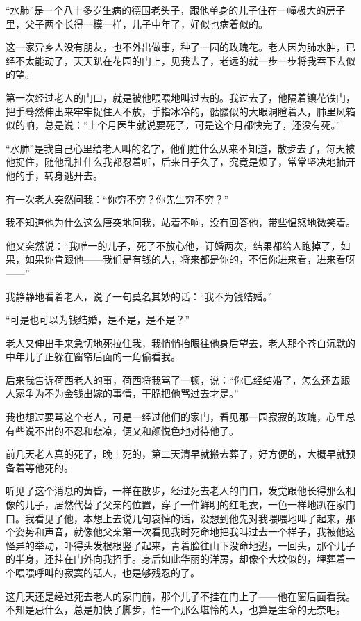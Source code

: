 \par “水肺”是一个八十多岁生病的德国老头子，跟他单身的儿子住在一幢极大的房子里，父子两个长得一模一样，儿子中年了，好似也病着似的。
\par 这一家异乡人没有朋友，也不外出做事，种了一园的玫瑰花。老人因为肺水肿，已经不太能动了，天天趴在花园的门上，见我去了，老远的就一步一步将我吞下去似的望。
\par 第一次经过老人的门口，就是被他喂喂地叫过去的。我过去了，他隔着镶花铁门，把手蓦然伸出来牢牢捉住人不放，手指冰冷的，骷髅似的大眼洞瞪着人，肺里风箱似的响，总是说：“上个月医生就说要死了，可是这个月都快完了，还没有死。”
\par “水肺”是我自己心里给老人叫的名字，他们姓什么从来不知道，散步去了，每天被他捉住，随他乱扯什么我都忍着听，后来日子久了，究竟是烦了，常常坚决地抽开他的手，转身逃开去。
\par 有一次老人突然问我：“你穷不穷？你先生穷不穷？”
\par 我不知道他为什么这么唐突地问我，站着不响，没有回答他，带些愠怒地微笑着。
\par 他又突然说：“我唯一的儿子，死了不放心他，订婚两次，结果都给人跑掉了，如果，如果你肯跟他——我们是有钱的人，将来都是你的，不信你进来看，进来看呀——”
\par 我静静地看着老人，说了一句莫名其妙的话：“我不为钱结婚。”
\par “可是也可以为钱结婚，是不是，是不是？”
\par 老人又伸出手来急切地死拉住我，我悄悄抬眼往他身后望去，老人那个苍白沉默的中年儿子正躲在窗帘后面的一角偷看我。
\par 后来我告诉荷西老人的事，荷西将我骂了一顿，说：“你已经结婚了，怎么还去跟人家争为不为金钱出嫁的事情，干脆把他骂过去才是。”
\par 我也想过要骂这个老人，可是一经过他们的家门，看见那一园寂寂的玫瑰，心里总有些说不出的不忍和悲凉，便又和颜悦色地对待他了。
\par 前几天老人真的死了，晚上死的，第二天清早就搬去葬了，好方便的，大概早就预备着等他死的。
\par 听见了这个消息的黄昏，一样在散步，经过死去老人的门口，发觉跟他长得那么相像的儿子，居然代替了父亲的位置，穿了一件鲜明的红毛衣，一色一样地趴在家门口。我看见了他，本想上去说几句哀悼的话，没想到他先对我喂喂地叫了起来，那个姿势和声音，就像他父亲第一次看见我时死命地把我叫过去一个样子，我被他这怪异的举动，吓得头发根根竖了起来，青着脸往山下没命地逃，一回头，那个儿子的半身，还挂在门外向我招手。身后如此华丽的洋房，却像个大坟似的，埋葬着一个喂喂呼叫的寂寞的活人，也是够残忍的了。
\par 这几天还是经过死去老人的家门前，那个儿子不挂在门上了——他在窗后面看我。不知是忌什么，总是加快了脚步，怕一个那么堪怜的人，也算是生命的无奈吧。
